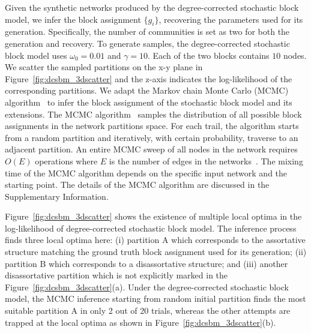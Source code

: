 Given the synthetic networks produced by the degree-corrected stochastic block model, we infer the block assignment $\{g_i\}$, recovering the parameters used for its generation. Specifically, the number of communities is set as two for both the generation and recovery. To generate samples, the degree-corrected stochastic block model uses $\omega_{0}=0.01$ and $\gamma=10$. Each of the two blocks contains $10$ nodes. We scatter the sampled partitions on the x-y plane in Figure~\ref{fig:dcsbm_3dscatter} and the z-axis indicates the log-likelihood of the corresponding partitions. We adapt the Markov chain Monte Carlo (MCMC) algorithm~\cite{nasrabadi2007pattern,peixoto2014efficient} to infer the block assignment of the stochastic block model and its extensions. The MCMC algorithm~\cite{peixoto2014efficient} samples the distribution of all possible block assignments in the network partitions space. For each trail, the algorithm starts from a random partition and iteratively, with certain probability, traverse to an adjacent partition. An entire MCMC sweep of all nodes in the network requires $O(E)$ operations where $E$ is the number of edges in the networks~\cite{peixoto2014efficient}. The mixing time of the MCMC algorithm depends on the specific input network and the starting point. The details of the MCMC algorithm are discussed in the Supplementary Information.

Figure~\ref{fig:dcsbm_3dscatter} shows the existence of multiple local optima in the log-likelihood of degree-corrected stochastic block model. The inference process finds three local optima here: (i) partition A which corresponds to the assortative structure matching the ground truth block assignment used for its generation; (ii) partition B which corresponds to a disassortative structure; and (iii) another disassortative partition which is not explicitly marked in the Figure~\ref{fig:dcsbm_3dscatter}(a). Under the degree-corrected stochastic block model, the MCMC inference starting from random initial partition finds the most suitable partition A in only 2 out of 20 trials, whereas the other attempts are trapped at the local optima as shown in Figure~\ref{fig:dcsbm_3dscatter}(b).

